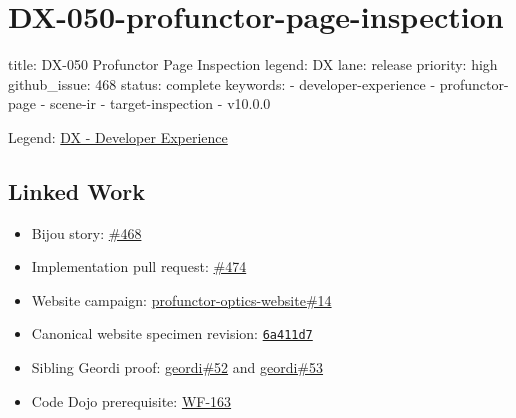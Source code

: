 \chapter{DX-050-profunctor-page-inspection}\label{record-146}

\smallskip

\begin{RecordMeta}
title: DX-050 Profunctor Page Inspection
legend: DX
lane: release
priority: high
github_issue: 468
status: complete
keywords:
  - developer-experience
  - profunctor-page
  - scene-ir
  - target-inspection
  - v10.0.0

\end{RecordMeta}

Legend: \href{https://github.com/flyingrobots/bijou/blob/1853ad902f6bf219326409e7f743a5a1d6517dbc/docs/legends/DX-developer-experience.md}{DX - Developer Experience}

\section{Linked Work}\label{record-146-linked-work}

\begin{itemize}
\tightlist
\item
  Bijou story: \href{https://github.com/flyingrobots/bijou/issues/468}{\#468}
\item
  Implementation pull request: \href{https://github.com/flyingrobots/bijou/pull/474}{\#474}
\item
  Website campaign: \href{https://github.com/flyingrobots/profunctor-optics-website/issues/14}{profunctor-optics-website\#14}
\item
  Canonical website specimen revision: \href{https://github.com/flyingrobots/profunctor-optics-website/commit/6a411d72c55edb6e4acc3b556d5cf96c303376f5}{\texttt{6\allowbreak{}a\allowbreak{}4\allowbreak{}1\allowbreak{}1\allowbreak{}d\allowbreak{}7}}
\item
  Sibling Geordi proof: \href{https://github.com/flyingrobots/geordi/issues/52}{geordi\#52} and \href{https://github.com/flyingrobots/geordi/pull/53}{geordi\#53}
\item
  Code Dojo prerequisite: \href{https://github.com/flyingrobots/bijou/blob/cbd70612140e7a450d764b3c7be1c6af878b99bc/docs/design/WF-163-respecting-dojo-ratchet-112.md}{WF-163}
\end{itemize}

